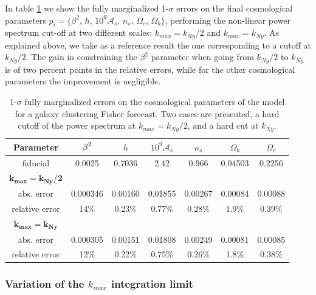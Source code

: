 In table \ref{tab:1-sigmaerrors-nl-GC-1} we show the fully marginalized
1-$\sigma$ errors on the final cosmological parameters $p_{i}=\{\beta^{2},\, h,\,10^{9}\mathcal{A}_{s},\, n_{s},\,\Omega_{c},\,\Omega_{b}\}$,
performing the non-linear power spectrum cut-off at two different
scales: $k_{max}=k_{Ny}/2$ and $k_{max}=k_{Ny}$. As explained above,
we take as a reference result the one corresponding to a cutoff at
$k_{Ny}/2$. The gain in constraining the $\beta^{2}$ parameter when
going from $k_{Ny}/2$ to $k_{Ny}$ is of two percent points in the
relative errors, while for the other cosmological parameters the improvement
is negligible.

\begin{table}
\centering{}%
\begin{tabular}{|c|c|c|c|c|c|c|}
\hline 
\textbf{Parameter}  & \textbf{$\text{\ensuremath{\beta}}^{2}$}  & $h$  & $10^{9}\mathcal{A}_{s}$  & $n_{s}$  & $\Omega_{b}$  & $\Omega_{c}$\tabularnewline
\hline 
fiducial  & 0.0025  & 0.7036  & 2.42  & 0.966  & 0.04503  & 0.2256\tabularnewline
\hline 
\textbf{$\mathbf{k_{max}=k_{Ny}/2}$}  &  &  &  &  &  & \tabularnewline
\hline 
abs. error  & 0.000346  & 0.00160  & 0.01855  & 0.00267  & 0.00084  & 0.00088\tabularnewline
relative error & 14\%  & 0.23\%  & 0.77\%  & 0.28\%  & 1.9\%  & 0.39\%\tabularnewline
\hline 
\textbf{$\mathbf{k_{max}=k_{Ny}}$}  &  &  &  &  &  & \tabularnewline
\hline 
abs. error  & 0.000305  & 0.00151  & 0.01808  & 0.00249  & 0.00081  & 0.00085\tabularnewline
relative error & 12\%  & 0.22\%  & 0.75\%  & 0.26\%  & 1.8\%  & 0.38\%\tabularnewline
\hline 
\end{tabular}\protect\protect
\caption[1$\sigma$ marginalized errors for Euclid GC in the CDE model.]{\label{tab:1-sigmaerrors-nl-GC-1} 1-$\sigma$ fully marginalized
errors on the cosmological parameters of the model for a galaxy clustering
Fisher forecast. Two cases are presented, a hard cutoff of the power
spectrum at $k_{max}=k_{Ny}/2$, and a hard cut at $k_{Ny}$.}
\end{table}



\subsubsection{Variation of the $k_{max}$ integration limit}

